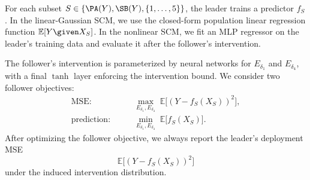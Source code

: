 For each subset $S\in\{\PA(Y),\SB(Y),\{1,\ldots,5\}\}$, the leader trains a
predictor $f_S$. In the linear-Gaussian SCM, we use the closed-form population
linear regression function $\mathbb E[Y\given X_S]$. In the nonlinear SCM, we fit
an MLP regressor on the leader's training data 
and evaluate it after the follower's
intervention.

The follower's intervention is parameterized by neural networks for
$E_{\delta_1}$ and $E_{\delta_4}$, with a final $\tanh$ layer enforcing the intervention
bound. We consider two follower objectives:
\begin{align*}
    \text{MSE:} \qquad
    &\max_{E_{\delta_1},E_{\delta_4}} \; \mathbb E\big[(Y-f_S(X_S))^2\big],\\
    \text{prediction:} \qquad
    &\min_{E_{\delta_1},E_{\delta_4}} \; \mathbb E\big[f_S(X_S)\big].
\end{align*}
After optimizing the follower objective, we always report the leader's
deployment MSE
\[
    \mathbb E\big[(Y-f_S(X_S))^2\big]
\]
under the induced intervention distribution.

